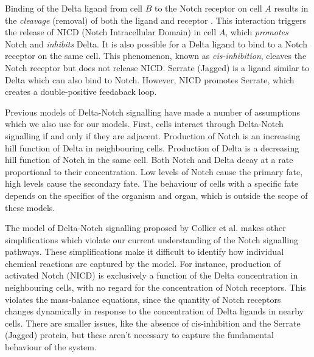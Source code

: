 \documentclass{article}
\begin{document}
\begin{flushleft}
\medskip


\medskip

Binding of the Delta ligand from cell $B$ to the Notch receptor on cell $A$ results in the \emph{cleavage} (removal) of both the ligand and receptor \cite{bray_notch_2006}.
This interaction triggers the release of NICD (Notch Intracellular Domain) in cell $A$, which \emph{promotes} Notch and \emph{inhibits} Delta.
It is also possible for a Delta ligand to bind to a Notch receptor on the same cell. This phenomenon, known as \emph{cis-inhibition}, cleaves the Notch receptor but does not release NICD.
Serrate (Jagged) is a ligand similar to Delta which can also bind to Notch.
However, NICD promotes Serrate, which creates a double-positive feedaback loop.

\medskip

Previous models of Delta-Notch signalling \cite{collier_pattern_1996, boareto_jaggeddelta_2015} have made a number of assumptions which we also use for our models.
First, cells interact through Delta-Notch signalling if and only if they are adjacent.
Production of Notch is an increasing hill function of Delta in neighbouring cells.
Production of Delta is a decreasing hill function of Notch in the same cell.
Both Notch and Delta decay at a rate proportional to their concentration.
Low levels of Notch cause the primary fate, high levels cause the secondary fate.
The behaviour   of cells with a specific fate depends on the specifics of the organism and organ, which is outside the scope of these models. 

\medskip

The model of Delta-Notch signalling proposed by Collier et al. \cite{collier_pattern_1996} makes other simplifications which violate our current understanding of the Notch signalling pathways.
These simplifications make it difficult to identify how individual chemical reactions are captured by the model.
For instance, production of activated Notch (NICD) is exclusively a function of the Delta concentration in neighbouring cells, with no regard for the concentration of Notch receptors.
This violates the mass-balance equations, since the quantity of Notch receptors changes dynamically in response to the concentration of Delta ligands in nearby cells.
There are smaller issues, like the absence of cis-inhibition and the Serrate (Jagged)
protein, but these aren’t necessary to capture the fundamental behaviour of the
system.


\end{flushleft}
\end{document}
